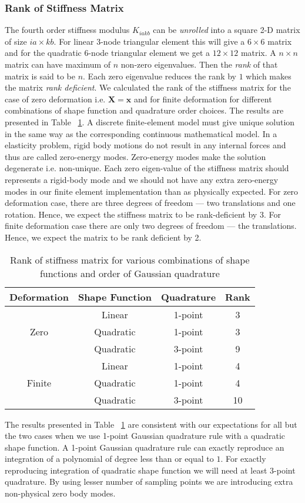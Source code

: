\documentclass[../main.tex]{subfiles}
\begin{document}
\subsubsection*{Rank of Stiffness Matrix}
The fourth order stiffness modulus $K_{iakb}$ can be \textit{unrolled}
into a square 2-D matrix of size $ia\times kb$. For linear 3-node
triangular element this will give a $6\times6$ matrix and for the
quadratic 6-node triangular element we get a $12\times12$ matrix. A
$n\times n$ matrix can have maximum of $n$ non-zero eigenvalues. Then
the \textit{rank} of that matrix is said to be $n$. Each zero
eigenvalue reduces the rank by $1$ which makes the matrix \textit{rank
  deficient}. We calculated the rank of the stiffness matrix for the
case of zero deformation i.e. $\mathbf{X}=\mathbf{x}$ and for finite
deformation for different combinations of shape function and
quadrature order choices. The results are presented in Table
~\ref{tab:rank}. A discrete finite-element model must give unique
solution in the same way as the corresponding continuous mathematical
model. In a elasticity problem, rigid body motions do not result in
any internal forces and thus are called zero-energy modes. Zero-energy
modes make the solution degenerate i.e. non-unique. Each zero
eigen-value of the stiffness matrix should represents a rigid-body
mode and we should not have any extra zero-energy modes in our finite
element implementation than as physically expected. For zero
deformation case, there are three degrees of freedom --- two
translations and one rotation. Hence, we expect the stiffness matrix
to be rank-deficient by 3. For finite deformation case there are only
two degrees of freedom --- the translations. Hence, we expect the
matrix to be rank deficient by 2.
\begin{table}
  \centering
  \caption{Rank of stiffness matrix for various combinations of shape functions and order of Gaussian quadrature}
  \label{tab:rank}
  \begin{tabular}{|c|c|c|c|}
    \hline
    Deformation & Shape Function & Quadrature & Rank \\
    \hline
    \multirow{3}{*}{Zero} & Linear & 1-point & 3 \\
    \cline{2-4}
                & Quadratic & 1-point & 3 \\
    \cline{2-4}
                & Quadratic & 3-point & 9 \\
    \hline
    \multirow{3}{*}{Finite} & Linear & 1-point & 4 \\
    \cline{2-4}
                & Quadratic & 1-point & 4 \\
    \cline{2-4}
                & Quadratic & 3-point & 10 \\
    \hline
  \end{tabular}
\end{table}
The results presented in Table ~\ref{tab:rank} are consistent with our
expectations for all but the two cases when we use 1-point Gaussian
quadrature rule with a quadratic shape function. A 1-point Gaussian
quadrature rule can exactly reproduce an integration of a polynomial
of degree less than or equal to $1$. For exactly reproducing
integration of quadratic shape function we will need at least 3-point
quadrature. By using lesser number of sampling points we are
introducing extra non-physical zero body modes.
\end{document}
